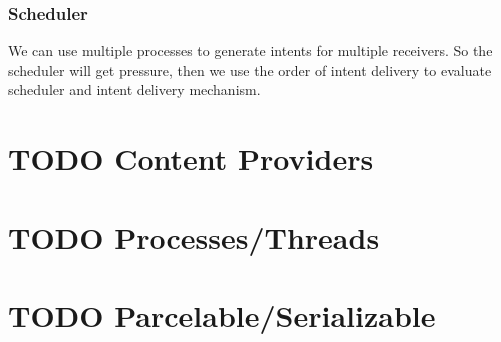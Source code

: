 \documentclass[11pt]{article}
\begin{document}
\subsubsection{Scheduler}
\label{sec-3-2-3}
We can use multiple processes to generate intents for multiple receivers.
So the scheduler will get pressure, then we use the order of intent delivery
to evaluate scheduler and intent delivery mechanism.

\section{{\bfseries\sffamily TODO} Content Providers}
\label{sec-4}
\section{{\bfseries\sffamily TODO} Processes/Threads}
\label{sec-5}
\section{{\bfseries\sffamily TODO} Parcelable/Serializable}
\label{sec-6}
\end{document}
